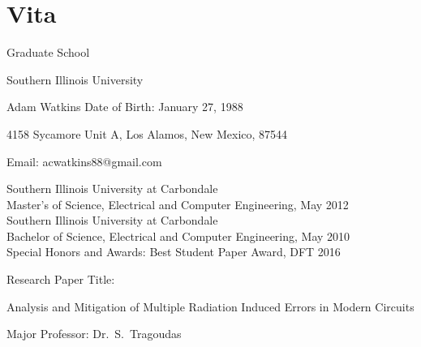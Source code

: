 

\chapter*{Vita}



\setlength{\baselineskip}{14pt}
\setlength{\parindent}{0pt}
\setlength{\parskip}{10pt}

\centerline{Graduate School}
\centerline{Southern Illinois University}

\bigskip
Adam Watkins \hfill Date of Birth: January 27, 1988\qquad 

4158 Sycamore Unit A, Los Alamos, New Mexico, 87544

\vskip4pt
Email: acwatkins88@gmail.com
\vskip2pt

Southern Illinois University at Carbondale\\
Master's of Science, Electrical and Computer Engineering, May 2012\\

Southern Illinois University at Carbondale\\
Bachelor of Science, Electrical and Computer Engineering, May 2010\\

\vspace{2pt}
Special Honors and Awards: Best Student Paper Award, DFT 2016

\vspace{4pt}
Research Paper Title: 

\vspace{-2pt}  %
{
Analysis and Mitigation of Multiple Radiation Induced Errors in Modern Circuits
\par}

\vspace{8pt}
Major Professor: Dr.\ S.\ Tragoudas


